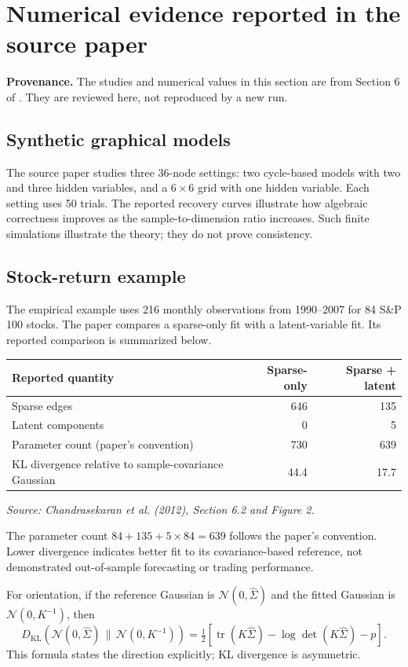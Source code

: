 \documentclass[11pt]{article}
\newcommand{\tr}{\operatorname{tr}}
\begin{document}
\newpage
\section{Numerical evidence reported in the source paper}
\textbf{Provenance.} The studies and numerical values in this section are from
Section 6 of \cite{cpw}. They are reviewed here, not reproduced by a new run.

\subsection{Synthetic graphical models}
The source paper studies three 36-node settings: two cycle-based models with
two and three hidden variables, and a $6\times6$ grid with one hidden variable.
Each setting uses 50 trials. The reported recovery curves illustrate how
algebraic correctness improves as the sample-to-dimension ratio increases.
Such finite simulations illustrate the theory; they do not prove consistency.

\subsection{Stock-return example}
The empirical example uses 216 monthly observations from 1990--2007 for
84 S\&P 100 stocks. The paper compares a sparse-only fit with a latent-variable
fit. Its reported comparison is summarized below.
\begin{center}
\small
\begin{tabular}{@{}lrr@{}}
\toprule
\textbf{Reported quantity} & \textbf{Sparse-only} & \textbf{Sparse + latent}\\
\midrule
Sparse edges & 646 & 135\\
Latent components & 0 & 5\\
Parameter count (paper's convention) & 730 & 639\\
KL divergence relative to sample-covariance Gaussian & 44.4 & 17.7\\
\bottomrule
\end{tabular}
\end{center}
\textit{Source: Chandrasekaran et al. (2012), Section 6.2 and Figure 2.}

The parameter count $84+135+5\times84=639$ follows the paper's convention.
Lower divergence indicates better fit to its covariance-based reference,
not demonstrated out-of-sample forecasting or trading performance.

For orientation, if the reference Gaussian is $\mathcal N(0,\widehat\Sigma)$
and the fitted Gaussian is $\mathcal N(0,K^{-1})$, then
\[
D_{\mathrm{KL}}\!\left(\mathcal N(0,\widehat\Sigma)\,\|\,
\mathcal N(0,K^{-1})\right)
=\tfrac12\!\left[\tr(K\widehat\Sigma)-\log\det(K\widehat\Sigma)-p\right].
\]
This formula states the direction explicitly; KL divergence is asymmetric.
\end{document}

